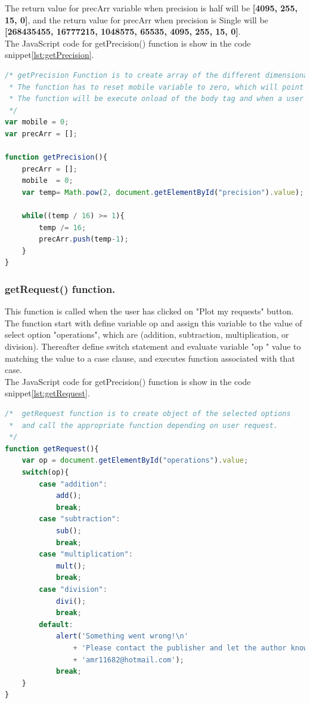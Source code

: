 \documentclass[11pt]{article}
\begin{document}
The return value for precArr variable when precision is half will be \textbf{[4095, 255, 15, 0]}, and the return value for precArr when precision is Single will be \textbf{[268435455, 16777215, 1048575, 65535, 4095, 255, 15, 0]}.\\
The JavaScript code for getPrecision() function is show in the code snippet\ref{lst:getPrecision}.\\
\begin{lstlisting}[label={lst:getPrecision}, language=Javascript, caption={getPrecision function},]
/* getPrecision Function is to create array of the different dimensional to chart.
 * The function has to reset mobile variable to zero, which will point to the start of precArr.
 * The function will be execute onload of the body tag and when a user changes the selected option of a <select> element.
 */
var mobile = 0;
var precArr = [];

function getPrecision(){
	precArr = [];
	mobile  = 0;
	var temp= Math.pow(2, document.getElementById("precision").value);

	while((temp / 16) >= 1){
		temp /= 16;
		precArr.push(temp-1); 
	}
}
\end{lstlisting}

\subsubsection{getRequest() function.} 
This function is called when the user has clicked on "Plot my requests" button. The function start with define variable op and assign this variable to the value of select option "operations", which are (addition, subtraction, multiplication, or division). Thereafter define switch statement and evaluate variable "op " value to matching the value to a case clause, and executes function associated with that case.\\
The JavaScript code for getPrecision() function is show in the code snippet\ref{lst:getRequest}.\\
\begin{lstlisting}[label={lst:getRequest}, language=Javascript, caption={getPrecision function},]
/*	getRequest function is to create object of the selected options
 *	and call the appropriate function depending on user request.
 */
function getRequest(){
	var op = document.getElementById("operations").value;
	switch(op){
		case "addition":
			add();
			break;
		case "subtraction":
			sub();
			break;
		case "multiplication":
			mult();
			break;
		case "division":
			divi();
			break;
		default:
			alert('Something went wrong!\n'
				+ 'Please contact the publisher and let the author know about the bug.\n'
				+ 'amr11682@hotmail.com');
			break;
	}
}
\end{lstlisting}
\end{document}
